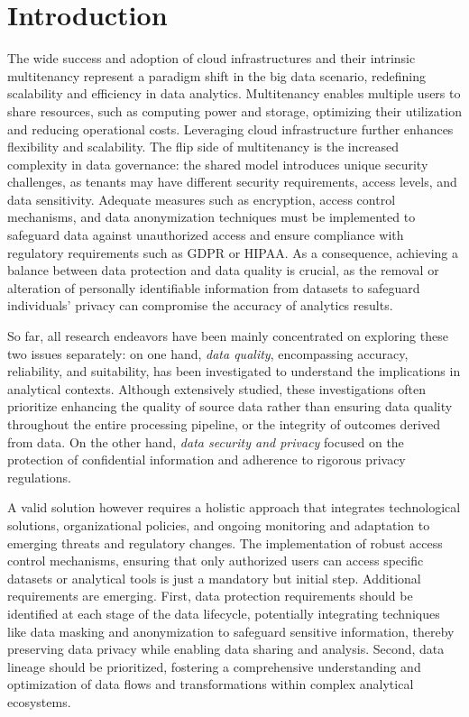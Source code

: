 \section{Introduction}
The wide success and adoption of cloud infrastructures and their intrinsic multitenancy represent a paradigm shift in the big data scenario, redefining scalability and efficiency in data analytics. Multitenancy enables multiple users to share resources, such as computing power and storage, optimizing their utilization and reducing operational costs. Leveraging cloud infrastructure further enhances flexibility and scalability.
%
The flip side of multitenancy is the increased complexity in data governance: the shared model introduces unique security challenges, as tenants may have different security requirements, access levels, and data sensitivity. Adequate measures such as encryption, access control mechanisms, and data anonymization techniques must be implemented to safeguard data against unauthorized access and ensure compliance with regulatory requirements such as GDPR or HIPAA.
%
As a consequence, achieving a balance between data protection and data quality is crucial, as the removal or alteration of personally identifiable information from datasets to safeguard individuals' privacy can compromise the accuracy of analytics results.

So far, all research endeavors have been mainly concentrated on exploring these two issues separately: on one hand, \emph{data quality}, encompassing accuracy, reliability, and suitability, has been investigated to understand the implications in analytical contexts. Although extensively studied, these investigations often prioritize enhancing the quality of source data rather than ensuring data quality throughout the entire processing pipeline, or the integrity of outcomes derived from data. On the other hand, \emph{data security and privacy} focused on the protection of confidential information and adherence to rigorous privacy regulations.

A valid solution however requires a holistic approach that integrates technological solutions, organizational policies, and ongoing monitoring and adaptation to emerging threats and regulatory changes. The implementation of robust access control mechanisms, ensuring that only authorized users can access specific datasets or analytical tools is just a mandatory but initial step. Additional requirements are emerging. First, data protection requirements should be identified at each stage of the data lifecycle, potentially integrating techniques like data masking and anonymization to safeguard sensitive information, thereby preserving data privacy while enabling data sharing and analysis. Second, data lineage should be prioritized, fostering a comprehensive understanding and optimization of data flows and transformations within complex analytical ecosystems. 

